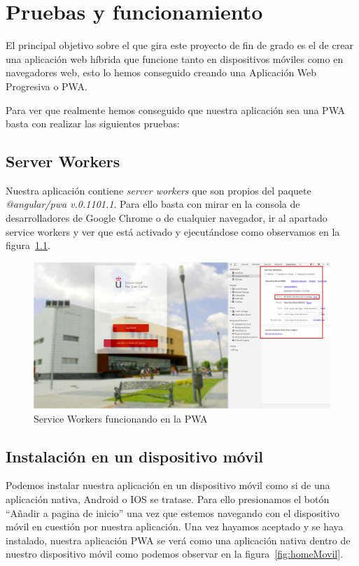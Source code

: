 \documentclass[a4paper, 12pt]{book}
\begin{document}

\cleardoublepage
\chapter{Pruebas y funcionamiento}

El principal objetivo sobre el que gira este proyecto de fin de grado es el de crear una aplicación web híbrida que funcione tanto en dispositivos móviles como en navegadores web, esto lo hemos conseguido creando una Aplicación Web Progresiva o PWA. 

Para ver que realmente hemos conseguido que nuestra aplicación sea una PWA basta con realizar las siguientes pruebas: 

\section{Server Workers}
Nuestra aplicación contiene \textit{server workers} que son propios del paquete \textit{@angular/pwa v.0.1101.1}. Para ello basta con mirar en la consola de desarrolladores de Google Chrome o de cualquier navegador, ir al apartado service workers y ver que está activado y ejecutándose como observamos en la figura~\ref{fig:serviceWorker}.
	
	\begin{figure}[h!]
  	\centering
  	\includegraphics[width=16cm, keepaspectratio]{img/principalWorker.png}
  	\caption{Service Workers funcionando en la PWA}\label{fig:serviceWorker}
	\end{figure}
	  
\section{Instalación en un dispositivo móvil}
Podemos instalar nuestra aplicación en un dispositivo móvil como si de una aplicación nativa, Android o IOS se tratase. Para ello presionamos el botón ``Añadir a pagina de inicio'' una vez que estemos navegando con el dispositivo móvil en cuestión por nuestra aplicación.
	Una vez hayamos aceptado y se haya instalado, nuestra aplicación PWA se verá como una aplicación nativa dentro de nuestro dispositivo móvil como podemos observar en la figura~\ref{fig:homeMovil}.
 
\end{document}
